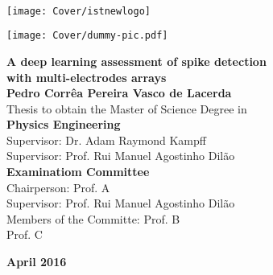 \setcounter{page}{1} 


\thispagestyle{empty}
\begin{flushleft} ~\\ \vspace{-12mm} \hspace{-12mm}  \texttt{[image: Cover/istnewlogo]} 
\vspace{10mm}
\\ \begin{center} \texttt{[image: Cover/dummy-pic.pdf]}  \end{center} %
 \vspace{5mm}
\centering
\LARGE \textbf{A deep learning assessment of spike detection \\ with multi-electrodes arrays}
\\ \vspace{10mm}
\Large \textbf{Pedro Corrêa Pereira Vasco de Lacerda} \\
\vspace{12mm}
\large Thesis to obtain the Master of Science Degree in
\\ \vspace{2mm}
\LARGE \textbf{Physics Engineering}
\\ \vspace{10mm}
\large Supervisor: Dr. Adam Raymond Kampff \\
\large Supervisor: Prof. Rui Manuel Agostinho Dilão
\\ \vspace{15mm}
\Large \textbf{Examinatiom Committee}
\\ \vspace{5mm}
\large Chairperson:	Prof. A \\
\large Supervisor: Prof. Rui Manuel Agostinho Dilão \\
\large Members of the Committe: Prof. B \\
Prof. C
 
\vspace{15mm}

\Large \textbf{April 2016} \\
\let\thepage\relax
\end{flushleft}
\pagebreak


\clearpage

\thispagestyle{empty}
\cleardoublepage

\setcounter{page}{1} 

\baselineskip 18pt %
